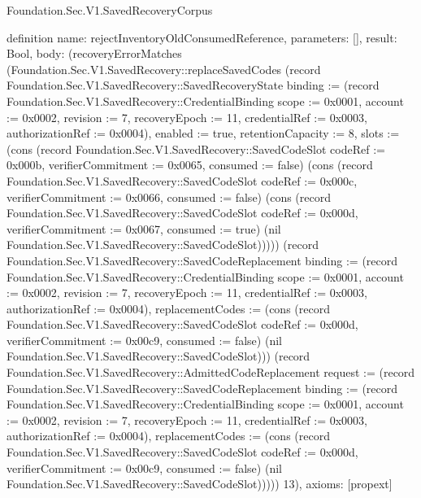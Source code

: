 \begin{lexlean}{Foundation.Sec.V1.SavedRecoveryCorpus}
\begin{semanticmodule}
definition{
  name: rejectInventoryOldConsumedReference,
  parameters: [],
  result: Bool,
  body: (recoveryErrorMatches (Foundation.Sec.V1.SavedRecovery::replaceSavedCodes (record Foundation.Sec.V1.SavedRecovery::SavedRecoveryState {binding := (record Foundation.Sec.V1.SavedRecovery::CredentialBinding {scope := 0x0001, account := 0x0002, revision := 7, recoveryEpoch := 11, credentialRef := 0x0003, authorizationRef := 0x0004}), enabled := true, retentionCapacity := 8, slots := (cons (record Foundation.Sec.V1.SavedRecovery::SavedCodeSlot {codeRef := 0x000b, verifierCommitment := 0x0065, consumed := false}) (cons (record Foundation.Sec.V1.SavedRecovery::SavedCodeSlot {codeRef := 0x000c, verifierCommitment := 0x0066, consumed := false}) (cons (record Foundation.Sec.V1.SavedRecovery::SavedCodeSlot {codeRef := 0x000d, verifierCommitment := 0x0067, consumed := true}) (nil Foundation.Sec.V1.SavedRecovery::SavedCodeSlot))))}) (record Foundation.Sec.V1.SavedRecovery::SavedCodeReplacement {binding := (record Foundation.Sec.V1.SavedRecovery::CredentialBinding {scope := 0x0001, account := 0x0002, revision := 7, recoveryEpoch := 11, credentialRef := 0x0003, authorizationRef := 0x0004}), replacementCodes := (cons (record Foundation.Sec.V1.SavedRecovery::SavedCodeSlot {codeRef := 0x000d, verifierCommitment := 0x00c9, consumed := false}) (nil Foundation.Sec.V1.SavedRecovery::SavedCodeSlot))}) (record Foundation.Sec.V1.SavedRecovery::AdmittedCodeReplacement {request := (record Foundation.Sec.V1.SavedRecovery::SavedCodeReplacement {binding := (record Foundation.Sec.V1.SavedRecovery::CredentialBinding {scope := 0x0001, account := 0x0002, revision := 7, recoveryEpoch := 11, credentialRef := 0x0003, authorizationRef := 0x0004}), replacementCodes := (cons (record Foundation.Sec.V1.SavedRecovery::SavedCodeSlot {codeRef := 0x000d, verifierCommitment := 0x00c9, consumed := false}) (nil Foundation.Sec.V1.SavedRecovery::SavedCodeSlot))})})) 13),
  axioms: [propext]
}


\end{semanticmodule}
\end{lexlean}
